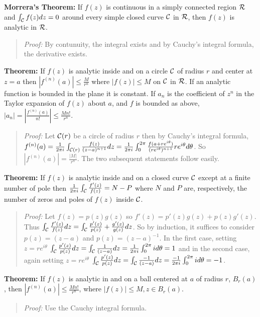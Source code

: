 {\bf Morrera's Theorem:}
If $f(z)$ is continuous in a simply connected region ${\cal R}$ and
$\int_{\cal C} f(z) dz = 0$ around every simple closed curve
${\cal C}$ in ${\cal R}$, then $f(z)$ is analytic in ${\cal R}$.
\begin{quote}
\emph{Proof:}
By contunuity, the integral exists and by Cauchy's integral formula, the derivative exists.
\end{quote}
{\bf Theorem:}
If $f(z)$ is analytic inside and on a circle ${\cal C}$ of
radius $r$ and center at $z=a$ then $|f^{(n)}(a)| \leq {\frac {M} {r^n}}$ where
$|f(z)| \leq M$ on ${\cal C}$ in ${\cal R}$.  If an analytic function is bounded in the
plane it is constant.  If $a_n$ is the coefficient of $z^n$ in the Taylor expansion of
$f(z)$ about $a$, and $f$ is bounded as above, 
$|a_n|= |{\frac {f^{(n)}(a)} {n!}}| \leq {\frac {M n!} {r^n}}$.
\begin{quote}
\emph{Proof:}
Let ${\cal C}(r)$ be a circle of radius $r$ then by Cauchy's integral formula,
$f^{(n)}(a)= 
{\frac 1 {2 \pi i}} \int_{{\cal C}(r)} {\frac {f(z)} {(z-a)^{n+1}}} dz=
{\frac 1 {2 \pi i}} \int_{0}^{2 \pi} 
{\frac {f(a+re^{i \theta})} {(re^{i \theta})^{n+1}}} r e^{i \theta} d \theta$.
So $|f^{(n)}(a)|= {\frac {|M|} {r^n}}$.  The two subsequent statements follow easily.
\end{quote}
{\bf Theorem:}
If $f(z)$ is analytic inside and on a closed curve ${\cal C}$ except at
a finite number of pole
then  ${\frac 1 {2 \pi i}} \int_{\cal C} {\frac {f'(z)} {f(z)}} =
N-P$ where $N$ and $P$ are, respectively, the number of zeros and poles of
$f(z)$ inside ${\cal C}$.
\begin{quote}
\emph{Proof:}
Let $f(z)= p(z) g(z)$ so $f'(z)= p'(z)g(z)+p(z)g'(z)$.  Thus
$\int_{\cal C} {\frac {f'(z)} {f(z)}} dz= 
\int_{\cal C} {\frac {p'(z)} {p(z)}} + {\frac {g'(z)} {g(z)}} dz $.  So by induction,
it suffices to consider $p(z)= (z-a)$ and $p(z)= (z-a)^{-1}$.  In the first case, 
setting $z=re^{i \theta}$
$\int_{\cal C} {\frac {p'(z)} {p(z)}} dz= 
\int_{\cal C} {\frac {1} {(z-a)}} dz= {\frac 1 {2 \pi i}} \int_0^{2 \pi} i d \theta = 1$
and in the second case, again setting $z=re^{i \theta}$
$\int_{\cal C} {\frac {p'(z)} {p(z)}} dz= 
\int_{\cal C} {\frac {-1} {(z-a)}} dz= {\frac {-1} {2 \pi i}} \int_0^{2 \pi} i d \theta = -1$.
\end{quote}
{\bf Theorem:} If $f(z)$ is analytic in and on a ball centered at $a$ of radius $r$, $B_r(a)$, then
$|f^{(n)}(a)| \leq {\frac {M n!} {r^n}}$, where  $|f(z)| \leq M, z \in B_r(a)$.
\begin{quote}
\emph{Proof:}
Use the Cauchy integral formula.
\end{quote}
